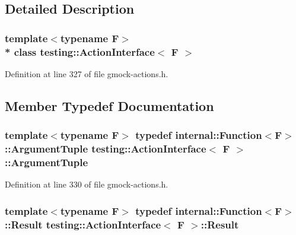 \subsection{Detailed Description}
\subsubsection*{template$<$typename F$>$\\*
class testing\+::\+Action\+Interface$<$ F $>$}



Definition at line 327 of file gmock-\/actions.\+h.



\subsection{Member Typedef Documentation}
\subsubsection[{\texorpdfstring{Argument\+Tuple}{ArgumentTuple}}]{\setlength{\rightskip}{0pt plus 5cm}template$<$typename F$>$ typedef {\bf internal\+::\+Function}$<$F$>$\+::{\bf Argument\+Tuple} {\bf testing\+::\+Action\+Interface}$<$ F $>$\+::{\bf Argument\+Tuple}}\hypertarget{classtesting_1_1_action_interface_af72720d864da4d606629e83edc003511}{}\label{classtesting_1_1_action_interface_af72720d864da4d606629e83edc003511}


Definition at line 330 of file gmock-\/actions.\+h.

\subsubsection[{\texorpdfstring{Result}{Result}}]{\setlength{\rightskip}{0pt plus 5cm}template$<$typename F$>$ typedef {\bf internal\+::\+Function}$<$F$>$\+::{\bf Result} {\bf testing\+::\+Action\+Interface}$<$ F $>$\+::{\bf Result}}\hypertarget{classtesting_1_1_action_interface_a7477de2fe3e4e01c59db698203acaee7}{}\label{classtesting_1_1_action_interface_a7477de2fe3e4e01c59db698203acaee7}


